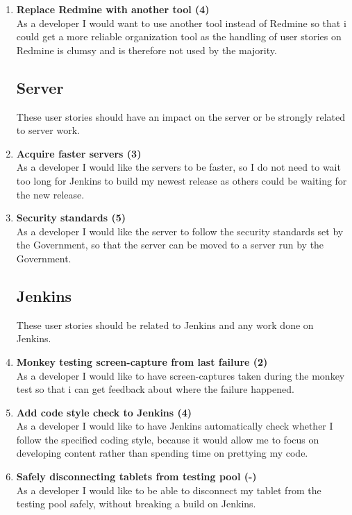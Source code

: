 \begin{enumerate}
\item \textbf{Replace Redmine with another tool (4)}\\
As a developer I would want to use another tool instead of Redmine so that i could get a more reliable organization tool as the handling of user stories on Redmine is clumsy and is therefore not used by the majority.

\subsection{Server}
These user stories should have an impact on the server or be strongly related to server work.

\item \textbf{Acquire faster servers (3)} \\
As a developer I would like the servers to be faster, so I do not need to wait too long for Jenkins to build my newest release as others could be waiting for the new release.

\item \textbf{Security standards (5)} \\
As a developer I would like the server to follow the security standards set by the Government, so that the server can be moved to a server run by the Government.

\subsection{Jenkins}
These user stories should be related to Jenkins and any work done on Jenkins.

\item \textbf{Monkey testing screen-capture from last failure (2)}\\
As a developer I would like to have screen-captures taken during the monkey test so that i can get feedback about where the failure happened. 

\item \textbf{Add code style check to Jenkins (4)}\\
As a developer I would like to have Jenkins automatically check whether I follow the specified coding style, because it would allow me to focus on developing content rather than spending time on prettying my code.

\item \textbf{Safely disconnecting tablets from testing pool (-)}\\
As a developer I would like to be able to disconnect my tablet from the testing pool safely, without breaking a build on Jenkins.


\end{enumerate}
